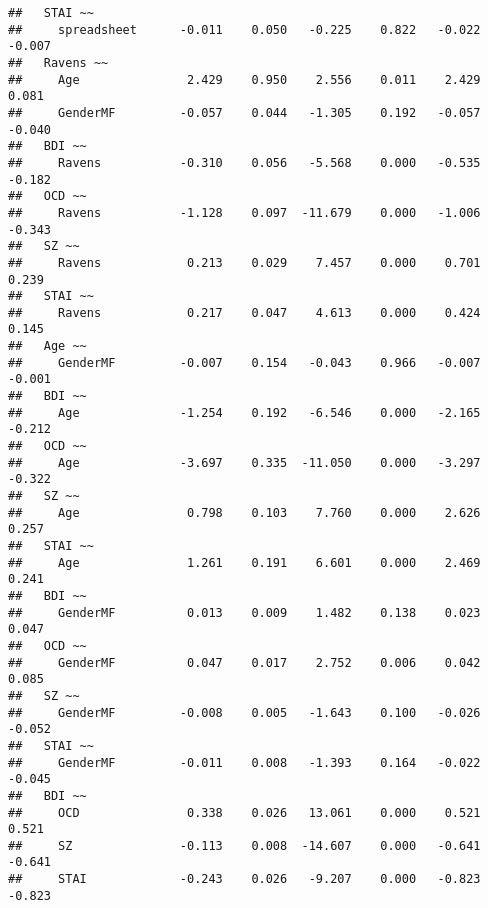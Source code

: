 \documentclass[]{article}
\begin{document}
\begin{verbatim}
##   STAI ~~                                                               
##     spreadsheet      -0.011    0.050   -0.225    0.822   -0.022   -0.007
##   Ravens ~~                                                             
##     Age               2.429    0.950    2.556    0.011    2.429    0.081
##     GenderMF         -0.057    0.044   -1.305    0.192   -0.057   -0.040
##   BDI ~~                                                                
##     Ravens           -0.310    0.056   -5.568    0.000   -0.535   -0.182
##   OCD ~~                                                                
##     Ravens           -1.128    0.097  -11.679    0.000   -1.006   -0.343
##   SZ ~~                                                                 
##     Ravens            0.213    0.029    7.457    0.000    0.701    0.239
##   STAI ~~                                                               
##     Ravens            0.217    0.047    4.613    0.000    0.424    0.145
##   Age ~~                                                                
##     GenderMF         -0.007    0.154   -0.043    0.966   -0.007   -0.001
##   BDI ~~                                                                
##     Age              -1.254    0.192   -6.546    0.000   -2.165   -0.212
##   OCD ~~                                                                
##     Age              -3.697    0.335  -11.050    0.000   -3.297   -0.322
##   SZ ~~                                                                 
##     Age               0.798    0.103    7.760    0.000    2.626    0.257
##   STAI ~~                                                               
##     Age               1.261    0.191    6.601    0.000    2.469    0.241
##   BDI ~~                                                                
##     GenderMF          0.013    0.009    1.482    0.138    0.023    0.047
##   OCD ~~                                                                
##     GenderMF          0.047    0.017    2.752    0.006    0.042    0.085
##   SZ ~~                                                                 
##     GenderMF         -0.008    0.005   -1.643    0.100   -0.026   -0.052
##   STAI ~~                                                               
##     GenderMF         -0.011    0.008   -1.393    0.164   -0.022   -0.045
##   BDI ~~                                                                
##     OCD               0.338    0.026   13.061    0.000    0.521    0.521
##     SZ               -0.113    0.008  -14.607    0.000   -0.641   -0.641
##     STAI             -0.243    0.026   -9.207    0.000   -0.823   -0.823

\end{verbatim}
\end{document}
